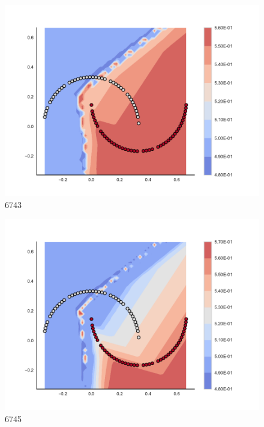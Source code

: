 \begin{subfigure}[b]{0.09\textwidth}
    \includegraphics[clip, trim=2.35cm 1.75cm 4.5cm 0cm,width=\textwidth]{img/convergence/6743.pdf}
    \caption{6743}
    \label{fig:convergence_6743}
\end{subfigure}
%
\begin{subfigure}[b]{0.09\textwidth}
    \includegraphics[clip, trim=2.35cm 1.75cm 4.5cm 0cm,width=\textwidth]{img/convergence/6745.pdf}
    \caption{6745}
    \label{fig:convergence_6745}
\end{subfigure}
%
